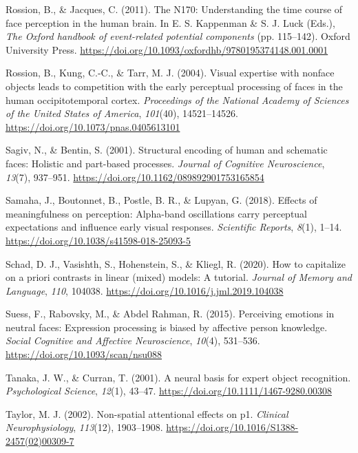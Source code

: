 \documentclass[
  english,
  man,11pt,floatsintext]{apa7}
\begin{document}
\leavevmode\hypertarget{ref-rossion2011}{}%
Rossion, B., \& Jacques, C. (2011). The N170: Understanding the time course of face perception in the human brain. In E. S. Kappenman \& S. J. Luck (Eds.), \emph{The Oxford handbook of event-related potential components} (pp. 115--142). Oxford University Press. \url{https://doi.org/10.1093/oxfordhb/9780195374148.001.0001}

\leavevmode\hypertarget{ref-rossion2004}{}%
Rossion, B., Kung, C.-C., \& Tarr, M. J. (2004). Visual expertise with nonface objects leads to competition with the early perceptual processing of faces in the human occipitotemporal cortex. \emph{Proceedings of the National Academy of Sciences of the United States of America}, \emph{101}(40), 14521--14526. \url{https://doi.org/10.1073/pnas.0405613101}

\leavevmode\hypertarget{ref-sagiv2001}{}%
Sagiv, N., \& Bentin, S. (2001). Structural encoding of human and schematic faces: Holistic and part-based processes. \emph{Journal of Cognitive Neuroscience}, \emph{13}(7), 937--951. \url{https://doi.org/10.1162/089892901753165854}

\leavevmode\hypertarget{ref-samaha2018}{}%
Samaha, J., Boutonnet, B., Postle, B. R., \& Lupyan, G. (2018). Effects of meaningfulness on perception: Alpha-band oscillations carry perceptual expectations and influence early visual responses. \emph{Scientific Reports}, \emph{8}(1), 1--14. \url{https://doi.org/10.1038/s41598-018-25093-5}

\leavevmode\hypertarget{ref-schad2020}{}%
Schad, D. J., Vasishth, S., Hohenstein, S., \& Kliegl, R. (2020). How to capitalize on a priori contrasts in linear (mixed) models: A tutorial. \emph{Journal of Memory and Language}, \emph{110}, 104038. \url{https://doi.org/10.1016/j.jml.2019.104038}

\leavevmode\hypertarget{ref-suess2015}{}%
Suess, F., Rabovsky, M., \& Abdel Rahman, R. (2015). Perceiving emotions in neutral faces: Expression processing is biased by affective person knowledge. \emph{Social Cognitive and Affective Neuroscience}, \emph{10}(4), 531--536. \url{https://doi.org/10.1093/scan/nsu088}

\leavevmode\hypertarget{ref-tanaka2001}{}%
Tanaka, J. W., \& Curran, T. (2001). A neural basis for expert object recognition. \emph{Psychological Science}, \emph{12}(1), 43--47. \url{https://doi.org/10.1111/1467-9280.00308}

\leavevmode\hypertarget{ref-taylor2002}{}%
Taylor, M. J. (2002). Non-spatial attentional effects on p1. \emph{Clinical Neurophysiology}, \emph{113}(12), 1903--1908. \url{https://doi.org/10.1016/S1388-2457(02)00309-7}
\end{document}
